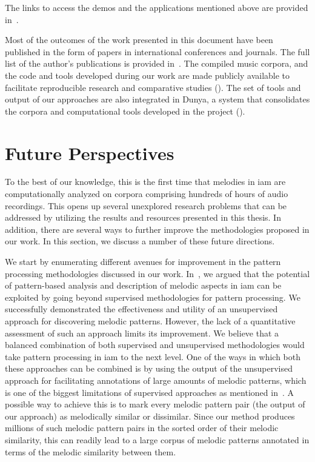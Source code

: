 The links to access the demos and the applications mentioned above are provided in~.

Most of the outcomes of the work presented in this document have been published in the form of papers in international conferences and journals. The full list of the author’s publications is provided in~. The compiled music corpora, and the code and tools developed during our work are made publicly available to facilitate reproducible research and comparative studies (). The set of tools and output of our approaches are also integrated in Dunya, a system that consolidates the corpora and computational tools developed in the project ().


\section{Future Perspectives}
\label{sec:future_directions}

To the best of our knowledge, this is the first time that melodies in \gls{iam} are computationally analyzed on corpora comprising hundreds of hours of audio recordings. This opens up several unexplored research problems that can be addressed by utilizing the results and resources presented in this thesis. In addition, there are several ways to further improve the methodologies proposed in our work. In this section, we discuss a number of these future directions. 

We start by enumerating different avenues for improvement in the pattern processing methodologies discussed in our work. In~, we argued that the potential of pattern-based analysis and description of melodic aspects in \gls{iam} can be exploited by going beyond supervised methodologies for pattern processing. We successfully demonstrated the effectiveness and utility of an unsupervised approach for discovering melodic patterns. However, the lack of a quantitative assessment of such an approach limits its improvement. We believe that a balanced combination of both supervised and unsupervised methodologies would take pattern processing in \gls{iam} to the next level. One of the ways in which both these approaches can be combined is by using the output of the unsupervised approach for facilitating annotations of large amounts of melodic patterns, which is one of the biggest limitations of supervised approaches as mentioned in~. A possible way to achieve this is to mark every melodic pattern pair (the output of our approach) as melodically similar or dissimilar. Since our method produces millions of such melodic pattern pairs in the sorted order of their melodic similarity, this can readily lead to a large corpus of melodic patterns annotated in terms of the melodic similarity between them.


